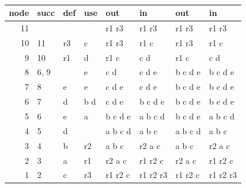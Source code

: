 \begin{solution}
\\
\begin{tabular}[t]{r|l>{\ttfamily}l>{\ttfamily}l|>{\ttfamily}l>{\ttfamily}l|>{\ttfamily}l>{\ttfamily}l}
node & succ & \textnormal{def} & \textnormal{use} & \textnormal{out} &
\textnormal{in} & \textnormal{out} & \textnormal{in} \\
\hline
11 &        &    &     & r1 r3   & r1 r3    & r1 r3   & r1 r3   \\
10 & 11     & r3 & c   & r1 r3   & r1 c     & r1 r3   & r1 c    \\
 9 & 10     & r1 & d   & r1 c    & c d      & r1 c    & c d     \\
 8 &  6, 9  &    & e   & c d     & c d e    & b c d e & b c d e \\
 7 &  8     & e  & e   & c d e   & c d e    & b c d e & b c d e \\
 6 &  7     & d  & b d & c d e   & b c d e  & b c d e & b c d e \\
 5 &  6     & e  & a   & b c d e & a b c d  & b c d e & a b c d \\
 4 &  5     & d  &     & a b c d & a b c    & a b c d & a b c   \\
 3 &  4     & b  & r2  & a b c   & r2 a c   & a b c   & r2 a c  \\
 2 &  3     & a  & r1  & r2 a c  & r1 r2 c  & r2 a c  & r1 r2 c \\
 1 &  2     & c  & r3  & r1 r2 c & r1 r2 r3 & r1 r2 c & r1 r2 r3
\end{tabular}
\end{solution}

